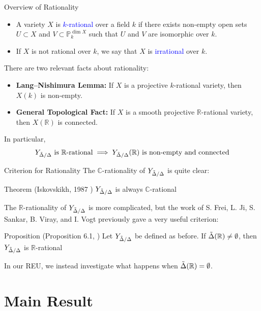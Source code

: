 \documentclass[hyperref, notheorems]{beamer}
\newcommand{\Rbb}{\mathbb{R}}
\newcommand{\Pbb}{\mathbb{P}}
\newcommand{\Cbb}{\mathbb{C}}
\newcommand{\txtblue}{\textcolor{blue}}
\newcommand{\Ydd}{Y_{\Tilde{\Delta} /\Delta}}
\theoremstyle{definition}
\begin{document}
\begin{frame}{Overview of Rationality}
\begin{itemize}
    \item A variety $X$ is \txtblue{$k$-rational} over a field $k$ if there exists non-empty open sets $U \subset X$ and $V \subset \Pbb^{\dim X}_k$ such that $U$ and $V$ are isomorphic over $k$.
    \item If $X$ is not rational over $k$, we say that $X$ is \txtblue{irrational} over $k$.
\end{itemize}

There are two relevant facts about rationality:
\begin{itemize}
    \item \textbf{Lang–Nishimura Lemma: } If $X$ is a projective $k$-rational variety, then $X(k)$ is non-empty.
    \item \textbf{General Topological Fact: } If $X$ is a smooth projective $\Rbb$-rational variety, then $X(\Rbb)$ is connected.
\end{itemize}

In particular,
\[\Ydd \text{ is $\Rbb$-rational} \implies \text{$\Ydd(\Rbb)$ is non-empty and connected}\]
\end{frame}

\begin{frame}{Criterion for Rationality}
The $\Cbb$-rationality of $\Ydd$ is quite clear:

\begin{block}{Theorem (Iskovskikh, 1987 \cite{Iskovskikh-rationality-cbs})}
    $\Ydd$ is always $\Cbb$-rational
\end{block}
The $\Rbb$-rationality of $\Ydd$ is more complicated, but the work of S. Frei, L. Ji, S. Sankar, B. Viray, and I. Vogt previously gave a very useful criterion:
\begin{block}{Proposition (Proposition 6.1, \cite{FJSVV})}
    Let $\Ydd$ be defined as before. If $\Tilde{\Delta}(\Rbb) \neq \emptyset$, then $\Ydd$ is $\Rbb$-rational
\end{block}
In our REU, we instead investigate what happens when $\Tilde{\Delta}(\Rbb) = \emptyset$.
\end{frame}

\section{Main Result}
\end{document}
